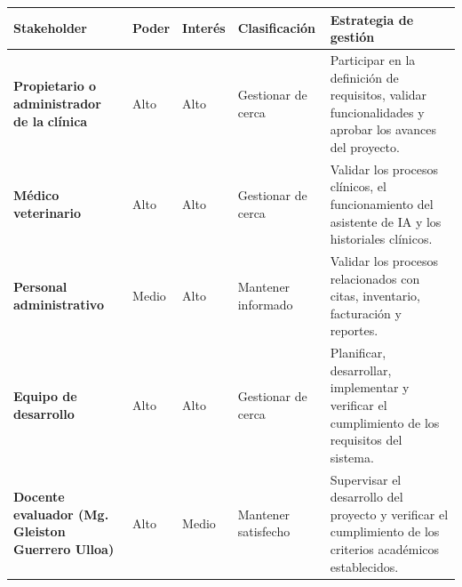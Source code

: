 \documentclass[
]{article}
\newcounter{none} %
\begin{document}
{\def\LTcaptype{none} %
\begin{longtable}[]{|
  >{\raggedright\arraybackslash}p{}|
  >{\raggedright\arraybackslash}p{}|
  >{\raggedright\arraybackslash}p{}|
  >{\raggedright\arraybackslash}p{}|
  >{\raggedright\arraybackslash}p{}|}
\hline
\begin{minipage}[b]{\linewidth}\raggedright
\textbf{Stakeholder}
\end{minipage} & \begin{minipage}[b]{\linewidth}\raggedright
\textbf{Poder}
\end{minipage} & \begin{minipage}[b]{\linewidth}\raggedright
\textbf{Interés}
\end{minipage} & \begin{minipage}[b]{\linewidth}\raggedright
\textbf{Clasificación}
\end{minipage} & \begin{minipage}[b]{\linewidth}\raggedright
\textbf{Estrategia de gestión}
\end{minipage} \\
\hline
\endhead
\hline
\endlastfoot
\textbf{Propietario o administrador de la} \textbf{clínica} & Alto & Alto & Gestionar de cerca &
\begin{minipage}[t]{\linewidth}\raggedright
Participar en la definición de requisitos, validar funcionalidades y aprobar los avances del proyecto.
\end{minipage} \\
\hline
\textbf{Médico veterinario} & Alto & Alto & Gestionar de cerca &
\begin{minipage}[t]{\linewidth}\raggedright
Validar los procesos clínicos, el funcionamiento del asistente de IA y los historiales clínicos.
\end{minipage} \\
\hline
\textbf{Personal administrativo} & Medio & Alto & Mantener informado &
\begin{minipage}[t]{\linewidth}\raggedright
Validar los procesos relacionados con citas, inventario, facturación y reportes.
\end{minipage} \\
\hline
\textbf{Equipo de desarrollo} & Alto & Alto & Gestionar de cerca &
\begin{minipage}[t]{\linewidth}\raggedright
Planificar, desarrollar, implementar y verificar el cumplimiento de los requisitos del sistema.
\end{minipage} \\
\hline
\textbf{Docente evaluador (Mg. Gleiston Guerrero Ulloa)} & Alto & Medio
& Mantener satisfecho & \begin{minipage}[t]{\linewidth}\raggedright
Supervisar el desarrollo del proyecto y verificar el cumplimiento de los
criterios académicos establecidos.
\end{minipage} \\
\hline
\end{longtable}
}
\end{document}
